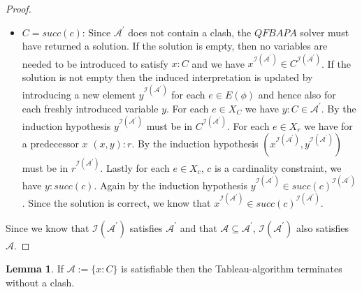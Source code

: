 \documentclass[a4paper,11pt]{scrartcl}
\theoremstyle{break}
\theoremstyle{definition}
\newtheorem{mylem}{Lemma}
\begin{document}
\begin{proof}
\begin{itemize}
\item $C=succ(c)$: Since $\mathcal{A}^\prime$ does not contain a clash, the $QFBAPA$ solver must have returned a solution. If the solution is empty, then no variables are needed to be introduced to satisfy $x:C$ and we have $x^{\mathcal{I}(\mathcal{A}^\prime)}\in C^{\mathcal{I}(\mathcal{A}^\prime)}$. If the solution is not empty then the induced interpretation is updated by introducing a new element $y^{\mathcal{I}(\mathcal{A}^\prime)}$ for each $e\in E(\phi)$ and hence also for each freshly introduced variable $y$. For each $e\in X_C$ we have $y:C\in \mathcal{A}^\prime$. By the induction hypothesis $y^{\mathcal{I}(\mathcal{A}^\prime)}$ must be in $C^{\mathcal{I}(\mathcal{A}^\prime)}$. For each $e\in X_r$ we have for a predecessor $x$ $(x,y):r$. By the induction hypothesis $(x^{\mathcal{I}(\mathcal{A}^\prime)},y^{\mathcal{I}(\mathcal{A}^\prime)})$ must be in $r^{\mathcal{I}(\mathcal{A}^\prime)}$. Lastly for each $e\in X_c$, $c$ is a cardinality constraint, we have $y:succ(c)$. Again by the induction hypothesis $y^{\mathcal{I}(\mathcal{A}^\prime)}\in succ(c)^{\mathcal{I}(\mathcal{A}^\prime)}$. Since the solution is correct, we know that $x^{\mathcal{I}(\mathcal{A}^\prime)}\in succ(c)^{\mathcal{I}(\mathcal{A}^\prime)}$.
\end{itemize}
Since we know that $\mathcal{I}(\mathcal{A}^\prime)$ satisfies $\mathcal{A}^\prime$ and that $\mathcal{A}\subseteq \mathcal{A}^\prime$, $\mathcal{I}(\mathcal{A}^\prime)$ also satisfies $\mathcal{A}$.
\end{proof}
\begin{mylem}
If $\mathcal{A}:=\{x:C\}$ is satisfiable then the Tableau-algorithm terminates without a clash.
\end{mylem}
\end{document}
